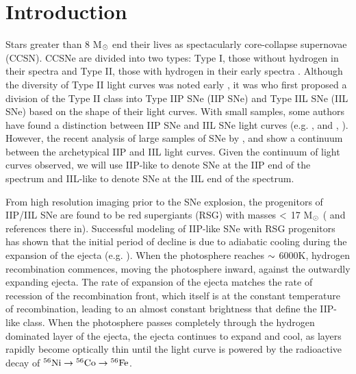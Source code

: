 \documentclass[a4paper,fleqn,usenatbib]{mnras}
\newcommand{\msun}{M$\rm{_{\odot}}$ }
\begin{document}
\section{Introduction}
Stars greater than 8 \msun end their lives as spectacularly core-collapse supernovae (CCSN). 
CCSNe are divided into two types: Type I, those without hydrogen in their spectra and Type II, those with hydrogen in their early spectra \citep{1941minkowski}.
Although the diversity of Type II light curves was noted early \citep{1964minkowski, 1967pskovskii}, it was \citet{1979barbon} who first proposed a division of the Type II class into Type IIP SNe (IIP SNe) and Type IIL SNe (IIL SNe) based on the shape of their light curves.
With small samples, some authors have found a distinction between IIP SNe and IIL SNe light curves  (e.g. \citealt{1993patat}, and \citealt{1994patat}, \citealt{2012arcavi}).
However, the recent analysis of large samples of SNe by \citet{2014anderson, 2014faran,2015sanders,2016valenti,2016galbany}, and \citet{2016rubin} show a continuum between the archetypical IIP and IIL light curves. 
Given the continuum of light curves observed, we will use IIP-like to denote SNe at the IIP end of the spectrum and IIL-like to denote SNe at the IIL end of the spectrum.

From high resolution imaging prior to the SNe explosion, the progenitors of IIP/IIL SNe are found to be red supergiants (RSG) with masses $\rm{<}$ 17  \msun (\citealt{2015smartt} and references there in).
Successful modeling of IIP-like SNe with RSG progenitors has shown that the initial period of decline is due to adiabatic cooling during the expansion of the ejecta (e.g. \citealt{1971grassberg,1977falk,1993blinnikov,2009kasen}).
When the photosphere reaches $\rm{\sim}$ 6000K, hydrogen recombination commences, moving the photosphere inward, against the outwardly expanding ejecta. 
The rate of expansion of the ejecta matches the rate of recession of the recombination front, which itself is at the constant temperature of recombination, leading to an almost constant brightness that define the IIP-like class.
When the photosphere passes completely through the hydrogen dominated layer of the ejecta, the ejecta continues to expand and cool, as layers rapidly become optically thin until the light curve is powered by the radioactive decay of $\rm{{}^{56}Ni \rightarrow {}^{56}Co \rightarrow {}^{56}Fe}$.
\end{document}
